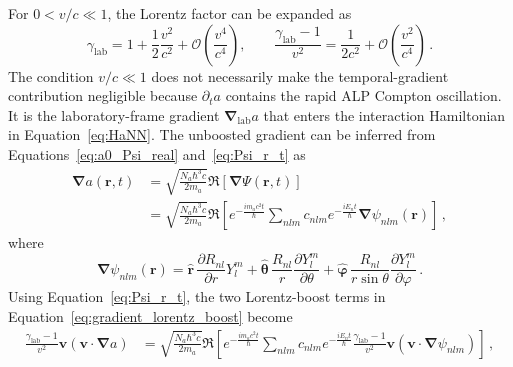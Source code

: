 For $0<v/c\ll1$, the Lorentz factor can be expanded as
\begin{equation}
    \gamma_\mathrm{lab}
    =1+\frac{1}{2}\frac{v^2}{c^2}
    +\mathcal{O}\left(\frac{v^4}{c^4}\right),
    \qquad
    \frac{\gamma_\mathrm{lab}-1}{v^2}
    =\frac{1}{2c^2}
    +\mathcal{O}\left(\frac{v^2}{c^4}\right)
    \,.
\end{equation}
The condition $v/c\ll1$ does not necessarily make the temporal-gradient contribution negligible because $\partial_t a$ contains the rapid ALP Compton oscillation.
It is the laboratory-frame gradient $\boldsymbol{\nabla}_\mathrm{lab}a$ that enters the interaction Hamiltonian in Equation~\eqref{eq:HaNN}.
The unboosted gradient can be inferred from Equations~\eqref{eq:a0_Psi_real} and~\eqref{eq:Psi_r_t} as
\begin{align}
    \boldsymbol{\nabla}a(\boldsymbol{r}, t)
    &= \sqrt{\frac{N_a \hbar^3 c}{2 m_a}} \Re\left[ \boldsymbol{\nabla} \Psi(\boldsymbol{r}, t) \right] \\
    &= \sqrt{\frac{N_a \hbar^3 c}{2 m_a}} \Re\left[ e^{-\frac{i m_a c^2 t}{\hbar}}\sum_{nlm}^{} c_{nlm} e^{-\frac{i E_n t}{\hbar}} \boldsymbol{\nabla}\psi_{nlm}(\boldsymbol{r}) \right]
    \,,\label{eq:gradient_Psi_sum}
\end{align}
where
\begin{equation}
    \boldsymbol{\nabla}\psi_{nlm}(\boldsymbol{r})
    = \hat{\boldsymbol{r}}\,\frac{\partial R_{nl}}{\partial r}Y_l^m + \hat{\boldsymbol{\theta}}\,\frac{R_{nl}}{r}\frac{\partial Y_l^m}{\partial \theta} + \hat{\boldsymbol{\varphi}}\,\frac{R_{nl}}{r\sin\theta}\frac{\partial Y_l^m}{\partial \varphi}
    \,.\label{eq:gradient_psi_nlm}
\end{equation}
Using Equation~\eqref{eq:Psi_r_t}, the two Lorentz-boost terms in Equation~\eqref{eq:gradient_lorentz_boost} become
\begin{align}
    \frac{\gamma_\mathrm{lab}-1}{v^2}\boldsymbol{v}
    \left(\boldsymbol{v}\cdot\boldsymbol{\nabla}a\right)
    &=
    \sqrt{\frac{N_a \hbar^3 c}{2 m_a}}
    \Re\left[
    e^{-\frac{i m_a c^2 t}{\hbar}}
    \sum_{nlm} c_{nlm}e^{-\frac{i E_n t}{\hbar}}
    \frac{\gamma_\mathrm{lab}-1}{v^2}\boldsymbol{v}
    \left(\boldsymbol{v}\cdot\boldsymbol{\nabla}\psi_{nlm}\right)
    \right]
    \,,\label{eq:gradient_boost_terms_1}
\end{align}
